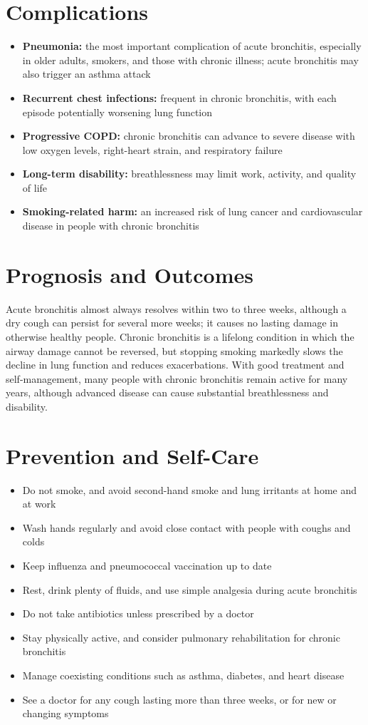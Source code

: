 \section*{Complications}
\begin{itemize}
    \item \textbf{Pneumonia:} the most important complication of acute bronchitis, especially in older adults, smokers, and those with chronic illness; acute bronchitis may also trigger an asthma attack
    \item \textbf{Recurrent chest infections:} frequent in chronic bronchitis, with each episode potentially worsening lung function
    \item \textbf{Progressive COPD:} chronic bronchitis can advance to severe disease with low oxygen levels, right-heart strain, and respiratory failure
    \item \textbf{Long-term disability:} breathlessness may limit work, activity, and quality of life
    \item \textbf{Smoking-related harm:} an increased risk of lung cancer and cardiovascular disease in people with chronic bronchitis
\end{itemize}

\section*{Prognosis and Outcomes}
Acute bronchitis almost always resolves within two to three weeks, although a dry cough can persist for several more weeks; it causes no lasting damage in otherwise healthy people. Chronic bronchitis is a lifelong condition in which the airway damage cannot be reversed, but stopping smoking markedly slows the decline in lung function and reduces exacerbations. With good treatment and self-management, many people with chronic bronchitis remain active for many years, although advanced disease can cause substantial breathlessness and disability.

\section*{Prevention and Self-Care}
\begin{itemize}
    \item Do not smoke, and avoid second-hand smoke and lung irritants at home and at work
    \item Wash hands regularly and avoid close contact with people with coughs and colds
    \item Keep influenza and pneumococcal vaccination up to date
    \item Rest, drink plenty of fluids, and use simple analgesia during acute bronchitis
    \item Do not take antibiotics unless prescribed by a doctor
    \item Stay physically active, and consider pulmonary rehabilitation for chronic bronchitis
    \item Manage coexisting conditions such as asthma, diabetes, and heart disease
    \item See a doctor for any cough lasting more than three weeks, or for new or changing symptoms
\end{itemize}

